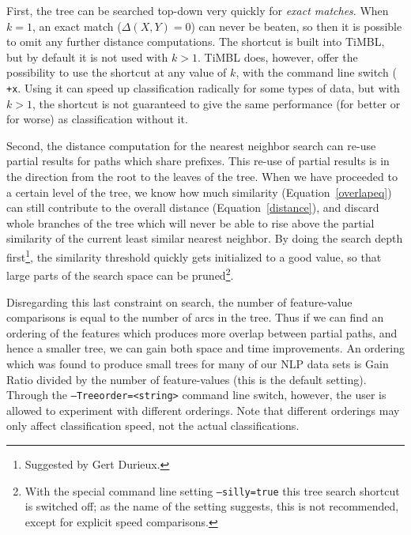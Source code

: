 \documentclass{book}
\begin{document}

First, the tree can be searched top-down very quickly for {\em exact
  matches}. When $k=1$, an exact match ($\Delta(X,Y)=0$) can never be
beaten, so then it is possible to omit any further distance
computations. The shortcut is built into TiMBL, but by default it is
not used with $k>1$. TiMBL does, however, offer the possibility to use
the shortcut at any value of $k$, with the command line switch ({\tt
  +x}. Using it can speed up classification radically for some types
of data, but with $k>1$, the shortcut is not guaranteed to give the
same performance (for better or for worse) as classification without
it.

Second, the distance computation for the nearest neighbor search can
re-use partial results for paths which share prefixes.  This re-use of
partial results is in the direction from the root to the leaves of the
tree. When we have proceeded to a certain level of the tree, we know
how much similarity (Equation~\ref{overlapeq}) can still contribute to
the overall distance (Equation~\ref{distance}), and discard whole
branches of the tree which will never be able to rise above the
partial similarity of the current least similar nearest neighbor. By
doing the search depth first\footnote{Suggested by Gert Durieux.}, the
similarity threshold quickly gets initialized to a good value, so that
large parts of the search space can be pruned\footnote{With the
  special command line setting {\tt --silly=true} this tree search shortcut
  is switched off; as the name of the setting suggests, this is not
  recommended, except for explicit speed comparisons.}.

Disregarding this last constraint on search, the number of
feature-value comparisons is equal to the number of arcs in the
tree. Thus if we can find an ordering of the features which produces
more overlap between partial paths, and hence a smaller tree, we can
gain both space and time improvements. An ordering which was found to
produce small trees for many of our NLP data sets is Gain Ratio
divided by the number of feature-values (this is the default
setting). Through the {\tt --Treeorder=<string>} command line switch,
however, the user is allowed to experiment with different
orderings. Note that different orderings may only affect
classification speed, not the actual classifications.
\end{document}
